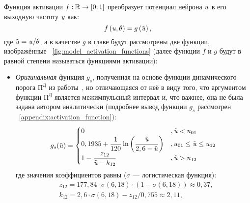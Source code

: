 Функция активации $f: \mathbb{R} \to \left[0;1\right]$ преобразует потенциал нейрона $\mathit{u}$ в его выходную частоту $\mathit{y}$ как:
\begin{equation}
    \label{eq:activation_function}
    f\left( \mathit{u}, \theta \right) = g\left( \tilde{\mathit{u}} \right), 
\end{equation}
где $\tilde{\mathit{u}} = \mathit{u} / \theta$, а в качестве $g$ в главе будут рассмотрены две функции, изображённые \onfigure~\ref{fig:model_activation_functions} (далее функции $f$ и $g$ будут в равной степени называться функциями активации):


\begin{itemize}
	\item \textit{Оригинальная} функция $g_{s}$, полученная на основе функции динамического порога $\text{П}^\text{Д}$ из работы~\cite{EmelyanovYaroslavsky1990}, но отличающаяся от неё в виду того, что аргументом функции  $\text{П}^\text{Д}$ является межимпульсный интервал и, что важнее, она не была задана автором аналитически (подробнее вывод функции $g_{s}$ рассмотрен \inappendix~\ref{appendix:activation_function}):
		\begin{equation}
            \label{eq:activation_function_original}
            g_{s}(\tilde{\mathit{u}}) = 
            \begin{cases}
                0                                                                                               &, \tilde{\mathit{u}} < u_{01} \\
                0,1935 + \dfrac{1}{120} \ln\left( \dfrac{\tilde{\mathit{u}}}{2,6 - \tilde{\mathit{u}}} \right)  &, u_{01} \le \tilde{\mathit{u}} \le u_{12} \\
                1 - \dfrac{z_{12}}{\tilde{\mathit{u}} - k_{12}}                                                   &, \tilde{\mathit{u}} > u_{12} \\
            \end{cases}
		\end{equation}
        где значения коэффициентов равны ($\sigma$ --- логистическая функция):
        \begin{align*}
            &z_{12} = 177,84 \cdot \sigma\left(6,18\right) \cdot \left(1 - \sigma\left(6,18\right)\right) \approx 0,37, \\
            &k_{12} = 2,6 \cdot \sigma\left(6,18\right) - z_{12} / 0,755 \approx 2,11, \\

\end{align*}
\end{itemize}
